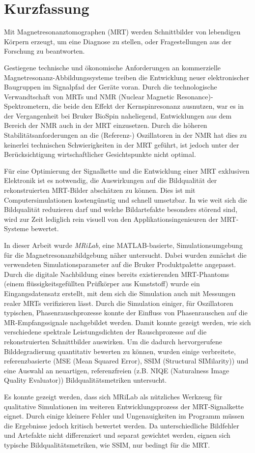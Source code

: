 \chapter*{Kurzfassung}
\thispagestyle{empty}
Mit Magnetresonanztomographen (MRT) werden Schnittbilder von lebendigen Körpern erzeugt, um eine Diagnose zu stellen, oder Fragestellungen aus der Forschung zu beantworten.

Gestiegene technische und ökonomische Anforderungen an kommerzielle Magnetresonanz-Abbildungssysteme treiben die Entwicklung neuer elektronischer Baugruppen im Signalpfad der Geräte voran. Durch die technologische Verwandtschaft von MRTs und NMR (Nuclear Magnetic Resonance)-Spektrometern, die beide den Effekt der Kernspinresonanz ausnutzen, war es in der Vergangenheit bei Bruker BioSpin naheliegend, Entwicklungen aus dem Bereich der NMR auch in der MRT einzusetzen. Durch die höheren Stabilitätsanforderungen an die (Referenz-) Oszillatoren in der NMR hat dies zu keinerlei technischen Schwierigkeiten in der MRT geführt, ist jedoch unter der Berücksichtigung wirtschaftlicher Gesichtspunkte nicht optimal.

Für eine Optimierung der Signalkette und die Entwicklung einer MRT exklusiven Elektronik ist es notwendig, die Auswirkungen auf die Bildqualität der rekonstruierten MRT-Bilder abschätzen zu können. Dies ist mit Computersimulationen kostengünstig und schnell umsetzbar. In wie weit sich die Bildqualität reduzieren darf und welche Bildartefakte besonders störend sind, wird zur Zeit lediglich rein visuell von den Applikationsingenieuren der MRT-Systeme bewertet.

In dieser Arbeit wurde \textit{MRiLab}, eine MATLAB-basierte, Simulationsumgebung für die Magnetresonanzbildgebung näher untersucht. Dabei wurden zunächst die verwendeten Simulationsparameter auf die Bruker Produktpalette angepasst. Durch die digitale Nachbildung eines bereits existierenden MRT-Phantoms (einem flüssigkeitsgefüllten Prüfkörper aus Kunststoff) wurde ein Eingangsdatensatz erstellt, mit dem sich die Simulation auch mit Messungen realer MRTs verifizieren lässt. Durch die Simulation einiger, für Oszillatoren typischen, Phasenrauschprozesse konnte der Einfluss von Phasenrauschen auf die MR-Empfangssignale nachgebildet werden. Damit konnte gezeigt werden, wie sich verschiedene spektrale Leistungsdichten der Rauschprozesse auf die rekonstruierten Schnittbilder auswirken.
Um die dadurch hervorgerufene Bilddegradierung quantitativ bewerten zu können, wurden einige verbreitete, referenzbasierte (MSE (Mean Squared Error), SSIM (Structural SIMilarity)) und eine Auswahl an neuartigen, referenzfreien (z.B. NIQE (Naturalness Image Quality Evaluator)) Bildqualitätsmetriken untersucht.

Es konnte gezeigt werden, dass sich MRiLab als nützliches Werkzeug für qualitative Simulationen im weiteren Entwicklungsprozess der MRT-Signalkette eignet. Durch einige kleinere Fehler und Ungenauigkeiten im Programm müssen die Ergebnisse jedoch kritisch bewertet werden. Da unterschiedliche Bildfehler und Artefakte nicht differenziert und separat gewichtet werden, eignen sich typische Bildqualitätsmetriken, wie SSIM, nur bedingt für die MRT.


